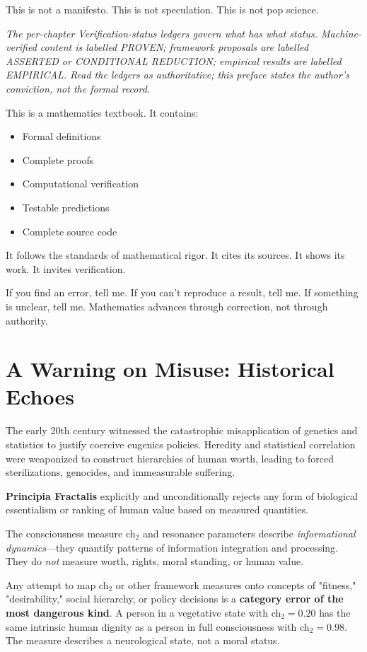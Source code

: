 This is not a manifesto. This is not speculation. This is not pop science.

\noindent\emph{The per-chapter Verification-status ledgers govern what has what status. Machine-verified content is labelled PROVEN; framework proposals are labelled ASSERTED or CONDITIONAL REDUCTION; empirical results are labelled EMPIRICAL. Read the ledgers as authoritative; this preface states the author's conviction, not the formal record.}

This is a mathematics textbook. It contains:
\begin{itemize}
\item Formal definitions
\item Complete proofs
\item Computational verification
\item Testable predictions
\item Complete source code
\end{itemize}

It follows the standards of mathematical rigor. It cites its sources. It shows its work. It invites verification.

If you find an error, tell me. If you can't reproduce a result, tell me. If something is unclear, tell me. Mathematics advances through correction, not through authority.

\section*{A Warning on Misuse: Historical Echoes}

The early 20th century witnessed the catastrophic misapplication of genetics and statistics to justify coercive eugenics policies. Heredity and statistical correlation were weaponized to construct hierarchies of human worth, leading to forced sterilizations, genocides, and immeasurable suffering.

\textbf{Principia Fractalis} explicitly and unconditionally rejects any form of biological essentialism or ranking of human value based on measured quantities.

The consciousness measure ch$_2$ and resonance parameters describe \textit{informational dynamics}—they quantify patterns of information integration and processing. They do \textit{not} measure worth, rights, moral standing, or human value.

Any attempt to map ch$_2$ or other framework measures onto concepts of "fitness," "desirability," social hierarchy, or policy decisions is a \textbf{category error of the most dangerous kind}. A person in a vegetative state with ch$_2 = 0.20$ has the same intrinsic human dignity as a person in full consciousness with ch$_2 = 0.98$. The measure describes a neurological state, not a moral status.

